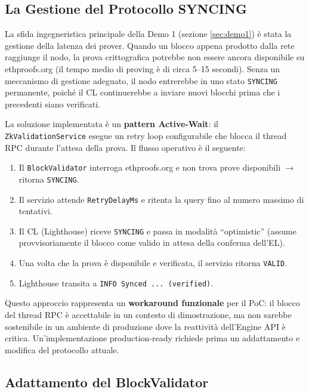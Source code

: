 \documentclass[12pt,a4paper,openright,twoside]{report}
\begin{document}
\subsection{La Gestione del Protocollo SYNCING}\label{sec:syncing}

La sfida ingegneristica principale della Demo 1 (sezione \ref{sec:demo1}) è stata la gestione della latenza dei prover. Quando un blocco appena prodotto dalla rete raggiunge il nodo, la prova crittografica potrebbe non essere ancora disponibile su ethproofs.org (il tempo medio di proving è di circa 5--15 secondi). Senza un meccanismo di gestione adeguato, il nodo entrerebbe in uno stato \texttt{SYNCING} permanente, poiché il CL continuerebbe a inviare nuovi blocchi prima che i precedenti siano verificati.

La soluzione implementata è un \textbf{pattern Active-Wait}: il \\\texttt{ZkValidationService} esegue un retry loop configurabile che blocca il thread RPC durante l'attesa della prova. Il flusso operativo è il seguente:

\begin{enumerate}
    \item Il \texttt{BlockValidator} interroga ethproofs.org e non trova prove disponibili $\rightarrow$ ritorna \texttt{SYNCING}.
    \item Il servizio attende \texttt{RetryDelayMs} e ritenta la query fino al numero massimo di tentativi.
    \item Il CL (Lighthouse) riceve \texttt{SYNCING} e passa in modalità ``optimistic'' (assume provvisoriamente il blocco come valido in attesa della conferma dell'EL).
    \item Una volta che la prova è disponibile e verificata, il servizio ritorna \texttt{VALID}.
    \item Lighthouse transita a \texttt{INFO Synced ... (verified)}.
\end{enumerate}

Questo approccio rappresenta un \textbf{workaround funzionale} per il PoC: il blocco del thread RPC è accettabile in un contesto di dimostrazione, ma non sarebbe sostenibile in un ambiente di produzione dove la reattività dell'Engine API è critica. Un'implementazione production-ready richiede prima un addattamento e modifica del protocollo attuale.

\subsection{Adattamento del BlockValidator}
\end{document}
